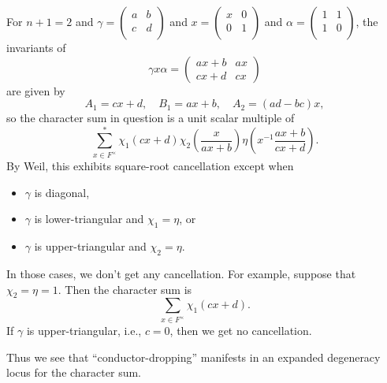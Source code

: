 \documentclass[reqno]{amsart} 
\begin{document}
\begin{example}
For $n+1=2$ and $\gamma =
\begin{pmatrix}
a & b \\
c & d \\
\end{pmatrix}$ and $x =
\begin{pmatrix}
x & 0 \\
0 & 1 \\
\end{pmatrix}$ and $\alpha =
\begin{pmatrix}
1 & 1 \\
1 & 0 \\
\end{pmatrix}$, the invariants of
\begin{equation*}
  \gamma x \alpha =
\begin{pmatrix}a x + b & a x\\c x + d & c x\end{pmatrix}
\end{equation*}
are given by
\begin{equation*}
A_1 = c x + d, \quad B_1 = a x + b, \quad A_2 = (a d - b c)x,
\end{equation*}
so the character sum in question is a unit scalar multiple of
\begin{equation*}
  \sum_{x \in F^\times }^*
  \chi_1 (c x + d ) \chi_2 \left( \frac{x}{a x + b} \right) \eta \left( x^{-1} \frac{a x + b}{c x + d} \right).
\end{equation*}
By Weil, this exhibits square-root cancellation except when
\begin{itemize}
\item $\gamma$ is diagonal,
\item $\gamma$ is lower-triangular and $\chi_1 = \eta$, or
\item $\gamma$ is upper-triangular and $\chi_2 = \eta$.
\end{itemize}
In those cases, we don't get any cancellation.  For example, suppose that $\chi_2 = \eta = 1$.  Then the character sum is
\begin{equation*}
\sum_{x \in F^\times } \chi_1 (c x + d).
\end{equation*}
  If $\gamma$ is upper-triangular, i.e., $c = 0$, then we get no cancellation.

Thus we see that ``conductor-dropping'' manifests in an expanded degeneracy locus for the character sum.
\end{example}
\end{document}
